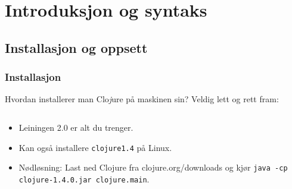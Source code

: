 \documentclass{beamer}
\begin{document}
\section{Introduksjon og syntaks}
\subsection{Installasjon og oppsett}
\begin{frame}
  \frametitle{Installasjon}

  Hvordan installerer man Clo{\em j}ure på maskinen sin? Veldig lett og rett
  fram:

  \begin{columns}
    \begin{column}{0.7\textwidth}
       \begin{itemize}
       \item<2-> Leiningen 2.0 er alt du trenger.
       \item<3-> Kan også installere {\tt clojure1.4} på Linux.
       \item<4-> Nødløsning: Last ned Clojure fra clojure.org/downloads og kjør
         \colorbox{solarbg}{\tt java -cp}
         \colorbox{solarbg}{\tt clojure-1.4.0.jar clojure.main}.
  \end{itemize}
    \end{column}
    \begin{column}{0.3\textwidth}

\end{column}
\end{columns}
\end{frame}
\end{document}
